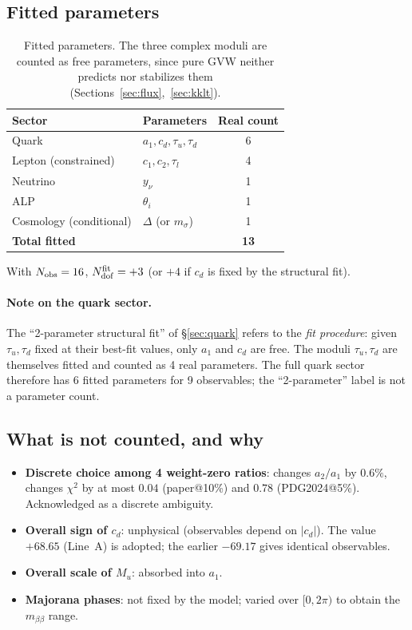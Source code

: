 \documentclass[12pt,a4paper]{article}
\numberwithin{equation}{section}
\begin{document}
\subsection{Fitted parameters}
\begin{table}[H]
\centering
\caption{Fitted parameters. The three complex moduli are
counted as free parameters, since pure GVW neither predicts nor
stabilizes them (Sections~\ref{sec:flux},~\ref{sec:kklt}).}
\label{tab:balance}
\begin{tabular}{llc}
\toprule
Sector & Parameters & Real count \\
\midrule
Quark & \(a_1, c_d, \tau_u, \tau_d\) & 6 \\
Lepton (constrained) & \(c_1, c_2, \tau_l\) & 4 \\
Neutrino & \(y_\nu\) & 1 \\
ALP & \(\theta_i\) & 1 \\
Cosmology (conditional) & \(\Delta\) (or \(m_\sigma\)) & 1 \\
\midrule
\textbf{Total fitted} & & \textbf{13} \\
\bottomrule
\end{tabular}
\end{table}

\noindent With \(N_{\rm obs}=16\), \(N_{\rm dof}^{\rm fit} = +3\)
(or \(+4\) if \(c_d\) is fixed by the structural fit).

\paragraph{Note on the quark sector.}
The ``2-parameter structural fit'' of \S\ref{sec:quark} refers to
the \emph{fit procedure}: given \(\tau_u, \tau_d\) fixed at their
best-fit values, only \(a_1\) and \(c_d\) are free. The moduli
\(\tau_u, \tau_d\) are themselves fitted and counted as 4 real
parameters. The full quark sector therefore has 6 fitted parameters
for 9 observables; the ``2-parameter'' label is not a parameter count.

\subsection{What is not counted, and why}
\begin{itemize}[leftmargin=1.5em]
\item \textbf{Discrete choice among 4 weight-zero ratios}: changes
\(a_2/a_1\) by \(0.6\%\), changes \(\chi^2\) by at most \(0.04\)
(paper@10\%) and \(0.78\) (PDG2024@5\%). Acknowledged as a discrete
ambiguity.
\item \textbf{Overall sign of \(c_d\)}: unphysical (observables depend
on \(|c_d|\)). The value \(+68.65\) (Line~A) is adopted; the earlier
\(-69.17\) gives identical observables.
\item \textbf{Overall scale of \(M_u\)}: absorbed into \(a_1\).
\item \textbf{Majorana phases}: not fixed by the model; varied over
\([0,2\pi)\) to obtain the \(m_{\beta\beta}\) range.
\end{itemize}
\end{document}

